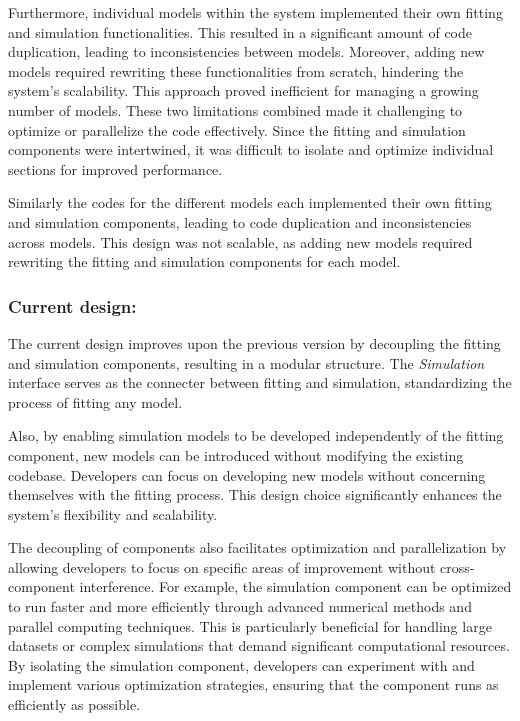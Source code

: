 Furthermore, individual models within the system implemented their own fitting and simulation functionalities. This resulted in a significant amount of code duplication, leading to inconsistencies between models. Moreover, adding new models required rewriting these functionalities from scratch, hindering the system's scalability. This approach proved inefficient for managing a growing number of models. These two limitations combined made it challenging to optimize or parallelize the code effectively. Since the fitting and simulation components were intertwined, it was difficult to isolate and optimize individual sections for improved performance.

\medskip

Similarly the codes for the different models each implemented their own fitting and simulation
components, leading to code duplication and inconsistencies across models. This design was not
scalable, as adding new models required rewriting the fitting and simulation components for each
model.

\subsubsection*{Current design:}

The current design improves upon the previous version by decoupling the fitting and 
simulation components, resulting in a modular structure. The \textit{Simulation} interface serves
 as the connecter between fitting and simulation, standardizing the process of fitting 
 any model.

\medskip

Also, by enabling simulation models to be developed independently of the fitting component, 
new models can be introduced without modifying the existing codebase. Developers can 
focus on developing new models without concerning themselves with the fitting process. 
This design choice significantly enhances the system's flexibility and scalability.

\medskip

The decoupling of components also facilitates optimization and 
parallelization by allowing developers to focus on specific areas of improvement without
 cross-component interference. For example, the simulation component can be optimized to
  run faster and more efficiently through advanced numerical methods and parallel 
  computing techniques. This is particularly beneficial for handling large datasets or complex simulations that demand significant computational resources. By isolating the simulation component, developers can experiment with and implement various optimization strategies, ensuring that the component runs as efficiently as possible.

